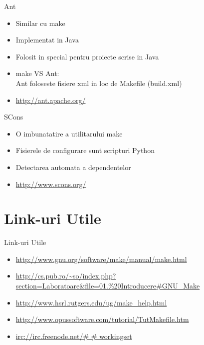 \documentclass{beamer}
\begin{document}
    \begin{frame}{Ant}
    \begin{itemize}
    \setlength{\itemsep}{0.8cm}
    \item Similar cu make
    \item Implementat in Java
    \item Folosit in special pentru proiecte scrise in Java
    \item make VS Ant:\\Ant foloseste fisiere xml in loc de Makefile ({\ttfamily build.xml})
    \item \url{http://ant.apache.org/}
    \end{itemize}
    \end{frame}

    \begin{frame}{SCons}
    \begin{itemize}
    \setlength{\itemsep}{1cm}
    \item O imbunatatire a utilitarului make
    \item Fisierele de configurare sunt scripturi Python
    \item Detectarea automata a dependentelor
    \item \url{http://www.scons.org/}
    \end{itemize}
    \end{frame}

\section{Link-uri Utile}
    \frame{\tableofcontents[currentsection]}

    \begin{frame}{Link-uri Utile}
    \begin{itemize}
    \setlength{\itemsep}{0.5cm}
    \footnotesize
    \item \url{http://www.gnu.org/software/make/manual/make.html}
    \item \url{http://cs.pub.ro/~so/index.php?section=Laboratoare\&file=01.\%20Introducere\#GNU\_Make}
    \item \url{http://www.hsrl.rutgers.edu/ug/make\_help.html}
    \item \url{http://www.opussoftware.com/tutorial/TutMakefile.htm}
    \item \url{irc://irc.freenode.net/\# \# workingset}
    \normalfont
    \end{itemize}
    \end{frame}
\end{document}
